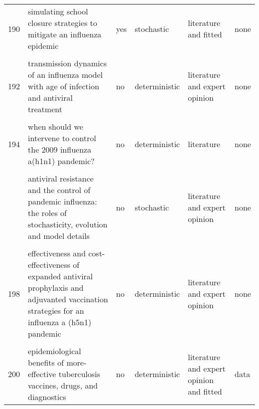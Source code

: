 \documentclass[
]{article}
\begin{document}
\begin{landscape}
\begin{longtable}{l>{\raggedright\arraybackslash}p{3cm}l>{\raggedright\arraybackslash}p{3cm}ll}
190 & simulating school closure strategies to mitigate an influenza epidemic & yes & stochastic & literature and fitted & none\\
\addlinespace
\cellcolor{gray!6}{191} & \cellcolor{gray!6}{the effect of mask use on the spread of influenza during a pandemic} & \cellcolor{gray!6}{no} & \cellcolor{gray!6}{deterministic} & \cellcolor{gray!6}{literature} & \cellcolor{gray!6}{none}\\
192 & transmission dynamics of an influenza model with age of infection and antiviral treatment & no & deterministic & literature and expert opinion & none\\
\cellcolor{gray!6}{193} & \cellcolor{gray!6}{transmission risks and control of foot-and-mouth disease in the netherlands: spatial patterns} & \cellcolor{gray!6}{yes} & \cellcolor{gray!6}{stochastic} & \cellcolor{gray!6}{literature and fitted} & \cellcolor{gray!6}{data}\\
194 & when should we intervene to control the 2009 influenza a(h1n1) pandemic? & no & deterministic & literature & none\\
\cellcolor{gray!6}{195} & \cellcolor{gray!6}{adaptive vaccination strategies to mitigate pandemic influenza} & \cellcolor{gray!6}{no} & \cellcolor{gray!6}{deterministic} & \cellcolor{gray!6}{literature and expert opinion and fitted} & \cellcolor{gray!6}{data}\\
\addlinespace
196 & antiviral resistance and the control of pandemic influenza: the roles of stochasticity, evolution and model details & no & stochastic & literature and expert opinion & none\\
\cellcolor{gray!6}{197} & \cellcolor{gray!6}{economic evaluation of influenza pandemic mitigation strategies in the united states using a stochastic microsimulation transmission model} & \cellcolor{gray!6}{no} & \cellcolor{gray!6}{deterministic} & \cellcolor{gray!6}{literature} & \cellcolor{gray!6}{none}\\
198 & effectiveness and cost-effectiveness of expanded antiviral prophylaxis and adjuvanted vaccination strategies for an influenza a (h5n1) pandemic & no & deterministic & literature and expert opinion & none\\
\cellcolor{gray!6}{199} & \cellcolor{gray!6}{engineering responses to pandemics} & \cellcolor{gray!6}{no} & \cellcolor{gray!6}{deterministic} & \cellcolor{gray!6}{literature and expert opinion} & \cellcolor{gray!6}{none}\\
200 & epidemiological benefits of more-effective tuberculosis vaccines, drugs, and diagnostics & no & deterministic & literature and expert opinion and fitted & data\\

\end{longtable}
\end{landscape}
\end{document}
